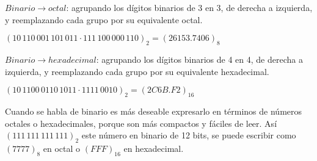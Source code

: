 \documentclass{article}
\begin{document}
$Binario \rightarrow octal$: agrupando los d\'{i}gitos binarios de 3 en 3,
de derecha a izquierda, y reemplazando cada grupo por su equivalente octal.
\begin{center}
    \large
    $(10\,110\,001\,101\,011 \cdot 111\,100\,000\,110)_2 = (26153.7406)_8$
\end{center}

$Binario \rightarrow hexadecimal$: agrupando los d\'{i}gitos binarios de 4 en 4,
de derecha a izquierda, y reemplazando cada grupo por su equivalente hexadecimal.
\begin{center}
    \large
    $(10\,1100\,0110\,1011 \cdot 1111\,0010)_2 = (2C6B.F2)_{16}$
\end{center}

Cuando se habla de binario es m\'{a}s deseable expresarlo en t\'{e}rminos de
n\'{u}meros octales o hexadecimales, porque son m\'{a}s compactos y f\'{a}ciles
de leer. As\'{i} $(111\,111\,111\,111)_2$ este n\'{u}mero en binario de 12 bits,
se puede escribir como $(7777)_8$ en octal o $(FFF)_{16}$ en hexadecimal.
\end{document}
